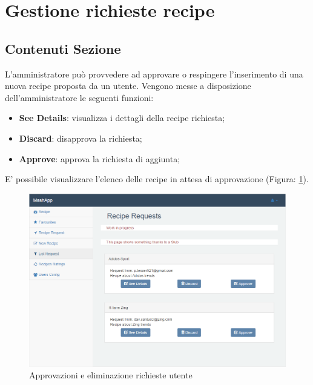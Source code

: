 %

\section{Gestione richieste recipe} %
\label{sec:gest_richieste}


	\subsection{Contenuti Sezione} %
	\label{sub:contenuti_sezione}
		L'amministratore può provvedere ad approvare o respingere l'inserimento di una nuova recipe\gloss{} proposta da un utente.\newline
		Vengono messe a disposizione dell'amministratore le seguenti funzioni:
		\begin{itemize}
			\item \textbf{See Details}: visualizza i dettagli della recipe richiesta;
			\item \textbf{Discard}: disapprova la richiesta;
			\item \textbf{Approve}: approva la richiesta di aggiunta;
		\end{itemize}
		E' possibile visualizzare l'elenco delle recipe\gloss{} in attesa di approvazione (Figura: \ref{fig:richiesta_ricette}).
		\begin{figure}[H]
			\centering
			\centerline{\includegraphics[width=14cm]{images/richiesta_ricette.png}}
			\caption{Approvazioni e eliminazione richieste utente}
			\label{fig:richiesta_ricette}
		\end{figure}


